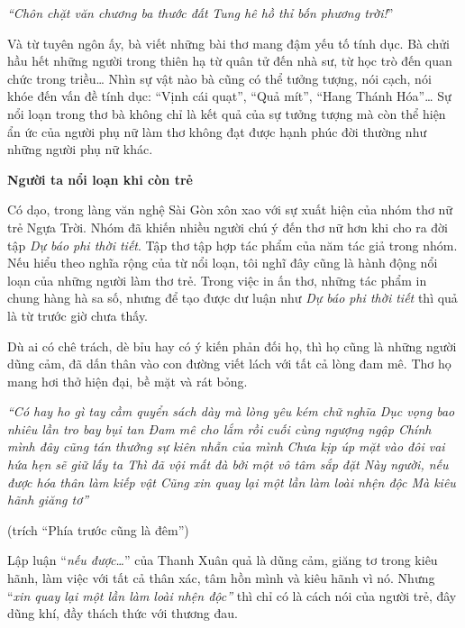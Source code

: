 \documentclass[../main.tex]{subfiles}
\begin{document}
\begin{multicols}{2}
\begin{blockquote}
\textit{“Chôn chặt văn chương ba thước đất}  
\textit{Tung hê hồ thỉ bốn phương trời!}” 

\end{blockquote}
 
Và từ tuyên ngôn ấy, bà viết những bài thơ mang đậm yếu tố tính dục. Bà chửi hầu hết những người trong thiên hạ từ quân tử đến nhà sư, từ học trò đến quan chức trong triều… Nhìn sự vật nào bà cũng có thể tưởng tượng, nói cạch, nói khóe đến vấn đề tính dục: “Vịnh cái quạt”, “Quả mít”, “Hang Thánh Hóa”… Sự nổi loạn trong thơ bà không chỉ là kết quả của sự tưởng tượng mà còn thể hiện ẩn ức của người phụ nữ làm thơ không đạt được hạnh phúc đời thường như những người phụ nữ khác.  
 
 
\textbf{Người ta nổi loạn khi còn trẻ} 
 
Có dạo, trong làng văn nghệ Sài Gòn xôn xao với sự xuất hiện của nhóm thơ nữ trẻ Ngựa Trời. Nhóm đã khiến nhiều người chú ý đến thơ nữ hơn khi cho ra đời tập \textit{Dự báo phi thời tiết}. Tập thơ tập hợp tác phẩm của năm tác giả trong nhóm. Nếu hiểu theo nghĩa rộng của từ nổi loạn, tôi nghĩ đây cũng là hành động nổi loạn của những người làm thơ trẻ. Trong việc in ấn thơ, những tác phẩm in chung hàng hà sa số, nhưng để tạo được dư luận như \textit{Dự báo phi thời tiết} thì quả là từ trước giờ chưa thấy.  
 
Dù ai có chê trách, dè bỉu hay có ý kiến phản đối họ, thì họ cũng là những người dũng cảm, đã dấn thân vào con đường viết lách với tất cả lòng đam mê. Thơ họ mang hơi thở hiện đại, bề mặt và rát bỏng. 
\begin{blockquote}
 
\textit{“Có hay ho gì tay cầm quyển sách dày mà lòng yêu kém chữ nghĩa 
Dục vọng bao nhiêu lần tro bay bụi tan 
Đam mê cho lắm rồi cuối cùng ngượng ngập 
Chính mình đây cũng tán thưởng sự kiên nhẫn của mình } 
\textit{Chưa kịp úp mặt vào đôi vai hứa hẹn sẽ giữ lấy ta 
Thì đã vội mất đà bởi một vô tâm sắp đặt 
Này người, nếu được hóa thân làm kiếp vật 
Cũng xin quay lại một lần làm loài nhện độc 
Mà kiêu hãnh giăng tơ”} 
        
(trích “Phía trước cũng là đêm”) 

\end{blockquote}
 
Lập luận “\textit{nếu được…}” của Thanh Xuân quả là dũng cảm, giăng tơ trong kiêu hãnh, làm việc với tất cả thân xác, tâm hồn mình và kiêu hãnh vì nó. Nhưng “\textit{xin quay lại một lần làm loài nhện độc”} thì chỉ có là cách nói của người trẻ, đây dũng khí, đầy thách thức với thương đau.  
 

\end{multicols}
\end{document}
